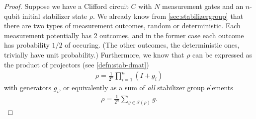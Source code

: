 \begin{proof}
Suppose we have a Clifford circuit $C$ with $N$ measurement gates and an
$n$-qubit initial stabilizer state $\rho$. We already
know from \cref{sec:stabilizergroup} that there are two types of measurement
outcomes, random or deterministic. Each measurement potentially has 2 outcomes,
and in the former case each outcome has probability $1 / 2$ of occuring. (The
other outcomes, the deterministic ones, trivially have unit probability.)
Furthermore, we know that $\rho$ can be expressed as the product of projectors
(see \cref{defn:stab-dmat})
\begin{align}
  \rho = \frac{1}{2^n} \prod_{i=1}^n (I + g_i)
\end{align}
with generators $g_i$,
or equivalently as a sum of \emph{all} stabilizer group elements
\begin{align}
  \rho = \frac{1}{2^n} \sum_{g\in \mathcal{S}(\rho)} g
.\end{align}


\end{proof}
